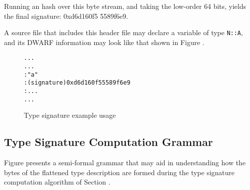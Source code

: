 Running an \MDfive{} hash over this byte stream, and taking the
low-order 64 bits, yields the final signature: 0xd6d160f5
5589f6e9.

A source file that includes this header file may declare a
variable of type \texttt{N::A}, and its DWARF information may look
like that shown in 
Figure .

\begin{figure}[ht]
\begin{dwflisting}
\begin{alltt}
  \DWTAGcompileunit
  ...
  \DWTAGsubprogram
    ...
    \DWTAGvariable
      \DWATname : "a"
      \DWATtype : (signature) 0xd6d160f5 5589f6e9
      \DWATlocation : ...
    ...
\end{alltt}
\end{dwflisting}
\caption{Type signature example usage}
\label{fig:typesignatureexampleusage}
\end{figure}

\subsection{Type Signature Computation Grammar}
\label{app:typesignaturecomputationgrammar}

Figure 
presents a semi-formal grammar that may aid in understanding
how the bytes of the flattened type description are formed
during the type signature computation algorithm of
Section . 

